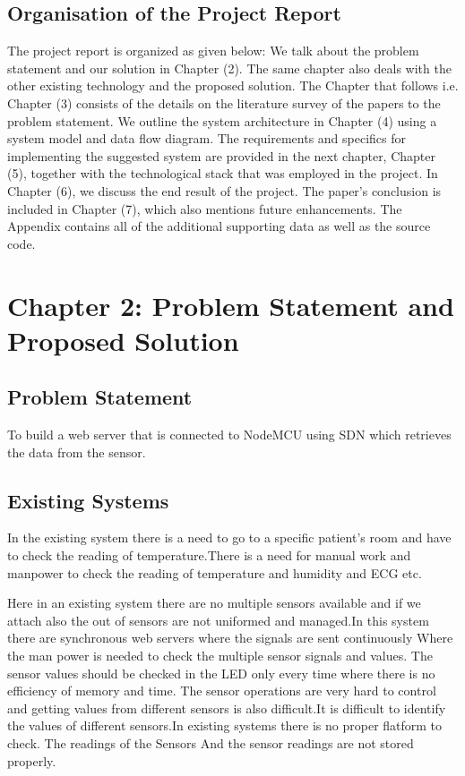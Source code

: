 \documentclass[12pt,a4paper,twocolumn,fleqn]{article}
\begin{document}
\subsection{Organisation of the Project Report}
The project report is organized as given below: We talk about the problem statement and our solution in Chapter (2). The same chapter also deals with the other existing technology and the proposed solution. The Chapter that follows i.e. Chapter (3) consists of the details on the literature survey of the papers to the problem statement.  We outline the system architecture in Chapter (4) using a system model and data flow diagram. The requirements and specifics for implementing the suggested system are provided in the next chapter, Chapter (5), together with the technological stack that was employed in the project. In Chapter (6), we discuss the end result of the project. The paper's conclusion is included in Chapter (7), which also mentions future enhancements. The Appendix contains all of the additional supporting data as well as the source code. \newpage
  \pagestyle{fancy}
  \thispagestyle{empty}
  \thispagestyle{plain}
   \fancyhf{}
  \chead{}
\renewcommand{\footrulewidth}{0.4pt}%
\normalsize
\section{Chapter 2: Problem Statement and Proposed Solution}
\subsection{Problem Statement}
To build a web server that is connected to NodeMCU using SDN which retrieves the data from the sensor. \\
\subsection{Existing Systems}
In the existing system there is a need to go to a specific patient's room and have to check the reading of temperature.There is a need for manual work and manpower to check the reading of temperature and humidity and ECG etc.

Here in an existing system there are no multiple sensors available and if we attach also the out of sensors are not uniformed and managed.In this system there are synchronous web servers where the signals are sent continuously Where the man power is needed to check the multiple sensor signals and values.
The sensor values should be checked in the LED only every time where there is no efficiency of memory and time. The sensor operations are very hard to control and getting values from different sensors is also difficult.It is difficult to identify the values of different sensors.In existing systems there is no proper flatform to check. The readings of the Sensors And the sensor readings are not stored properly.
\\
\end{document}
